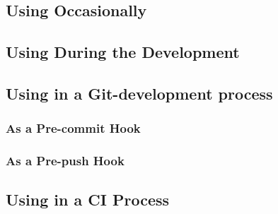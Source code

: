 \subsection{Using Occasionally}

\subsection{Using During the Development}

\subsection{Using in a Git-development process}
\subsubsection*{As a Pre-commit Hook}
\subsubsection*{As a Pre-push Hook}

\subsection{Using in a CI Process}

